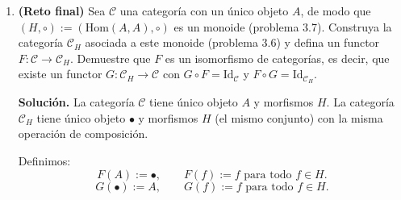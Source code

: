 \begin{enumerate}[label=\textbf{4.\arabic*.}]
\begin{enumerate}[label=\alph*)]
    \item \textit{Conmutatividad}: \([m,n]+[m',n']=[m+m',n+n']=[m'+m,n'+n]\). \checkmark
    \textit{Asociatividad}: hereda de \(M\). \checkmark
    \textit{Neutro}: \([0,0]\) pues \([m,n]+[0,0]=[m,n]\). \checkmark
    \textit{Inversos}: \([m,n]+[n,m]=[m+n,n+m]\sim[0,0]\) con \(p=0\)
    (pues \(m+n+0 = n+m+0\)). \checkmark \quad \textbf{\(M^+\) es grupo abeliano}.

    \item \(i(m+m')=[m+m',0]=[m,0]+[m',0]=i(m)+i(m')\). \checkmark
    Y \(i(0)=[0,0]=\) neutro de \(M^+\). \checkmark

    \item El isomorfismo es \(\varphi: M^+ \to \mathbb{Z}\), \(\varphi([a,b])=a-b\).
    \textit{Bien definida}: si \((a,b)\sim(a',b')\) existe \(p\) con
    \(a+b'+p=a'+b+p\), luego \(a-b=a'-b'\). \checkmark
    \textit{Homomorfismo}: \(\varphi([a,b]+[a',b'])=\varphi([a+a',b+b'])
    =(a+a')-(b+b')=(a-b)+(a'-b')=\varphi([a,b])+\varphi([a',b'])\). \checkmark
    \textit{Biyección}: sobreyectiva pues dado \(n \in \mathbb{Z}\), si \(n\geq 0\)
    toma \([n,0]\); si \(n<0\) toma \([0,-n]\). Inyectiva: si \(a-b=a'-b'\)
    entonces \(a+b'=a'+b\) con testigo \(0\). \checkmark

    \item Suponga \(i(m)=i(n)\), es decir \([m,0]=[n,0]\). Entonces existe \(p\)
    con \(m+0+p=n+0+p\), es decir \(m+p=n+p\). Por cancelatividad, \(m=n\).
    \hfill\(\square\)
\end{enumerate}

\item \textbf{(Reto final)} Sea \(\mathcal{C}\) una categoría con un único objeto
\(A\), de modo que \((H,\circ) := (\mathrm{Hom}(A,A),\circ)\) es un monoide
(problema 3.7). Construya la categoría \(\mathcal{C}_H\) asociada a este monoide
(problema 3.6) y defina un functor \(F:\mathcal{C}\to\mathcal{C}_H\). Demuestre
que \(F\) es un isomorfismo de categorías, es decir, que existe un functor
\(G:\mathcal{C}_H\to\mathcal{C}\) con \(G\circ F=\mathrm{Id}_{\mathcal{C}}\)
y \(F\circ G=\mathrm{Id}_{\mathcal{C}_H}\).

\textbf{Solución.}
La categoría \(\mathcal{C}\) tiene único objeto \(A\) y morfismos \(H\).
La categoría \(\mathcal{C}_H\) tiene único objeto \(\bullet\) y morfismos \(H\)
(el mismo conjunto) con la misma operación de composición.

Definimos:
\[
    F(A) := \bullet, \qquad F(f) := f \text{ para todo } f \in H.
\]
\[
    G(\bullet) := A, \qquad G(f) := f \text{ para todo } f \in H.
\]


\end{enumerate}
